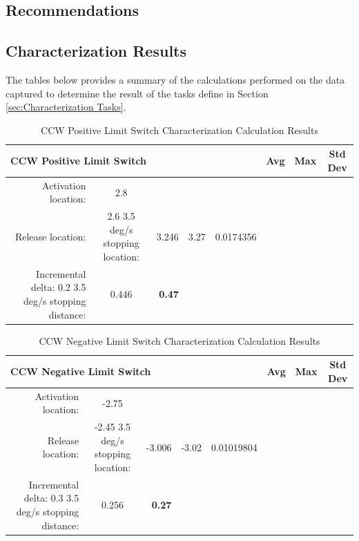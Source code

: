 \documentclass[SE,authoryear,toc]{lsstdoc}
\begin{document}
\begin{landscape}
\section{Recommendations}

\subsection{Characterization Results}

The tables below provides a summary of the calculations performed on the
data captured to determine the result of the tasks define in Section \ref{sec:Characterization Tasks}.

\begin{table}[h!]
  \begin{center}
    \caption{CCW Positive Limit Switch Characterization Calculation Results}
    \label{tab:table1}
    \begin{tabular}{r|c|r|c|r|c|c|c}
    \multicolumn{5}{l|}{\textbf{CCW Positive Limit Switch}} & Avg & Max & Std Dev\\
    \midrule
    Activation location: & 2.8 & & & & & & \\
    Release location: & 2.6 3.5 deg/s stopping location: & 3.246 & 3.27 & 0.0174356 \\
    Incremental delta: 0.2 3.5 deg/s stopping distance: & 0.446 & \textbf{0.47} & \\
    \end{tabular}
  \end{center}
\end{table}

\begin{table}[h!]
  \begin{center}
    \caption{CCW Negative Limit Switch Characterization Calculation Results}
    \label{tab:table2}
    \begin{tabular}{r|c|r|c|r|c|c|c}
    \multicolumn{5}{l|}{\textbf{CCW Negative Limit Switch}} & Avg & Max & Std Dev\\
    \midrule
    Activation location: & -2.75 & & & & & & \\
    Release location: & -2.45 3.5 deg/s stopping location: & -3.006 & -3.02 & 0.01019804 \\
    Incremental delta: 0.3 3.5 deg/s stopping distance: & 0.256 & \textbf{0.27} & \\
    \end{tabular}
  \end{center}
\end{table}


\end{landscape}
\end{document}
